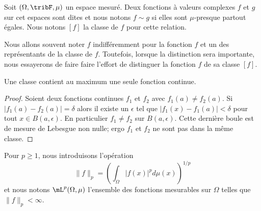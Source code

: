 \begin{definition}      \label{DEFooKMJQooXeaUtp}
    Soit \( (\Omega,\tribF,\mu)\) un espace mesuré. Deux fonctions à valeurs complexes \( f\) et \( g\) sur cet espaces sont dites  et nous notons \( f\sim g\) si elles sont \( \mu\)-presque partout égales. Nous notons \( [f]\) la classe de \( f\) pour cette relation.
\end{definition}

Nous allons souvent noter \( f\) indifféremment pour la fonction \( f\) et un des représentants de la classe de \( f\). Toutefois, lorsque la distinction sera importante, nous essayerons de faire faire l'effort de distinguer la fonction \( f\) de sa classe \( [f]\).

\begin{lemma}
    Une classe contient au maximum une seule fonction continue.
\end{lemma}

\begin{proof}
    Soient deux fonctions continues \( f_1\) et \( f_2\) avec \( f_1(a)\neq f_2(a)\). Si \( | f_1(a)-f_2(a) |=\delta\) alors il existe un \( \epsilon\) tel que \( | f_1(x)-f_1(a) |<\delta\) pour tout \( x\in B(a,\epsilon)\). En particulier \( f_1\neq f_2\) sur \( B(a,\epsilon)\). Cette dernière boule est de mesure de Lebesgue non nulle; ergo \( f_1\) et \( f_2\) ne sont pas dans la même classe.
\end{proof}

\begin{definition}      \label{DEFooTHIDooWYzBtn}
    Pour \( p\geq 1\), nous introduisons l'opération
    \begin{equation}        \label{EQooBDBXooCHRmpo}
        \| f \|_p=\left( \int_{\Omega}| f(x) |^pd\mu(x) \right)^{1/p}
    \end{equation}
    et nous notons \( \mL^p(\Omega,\mu)\) l'ensemble des fonctions mesurables sur \( \Omega\) telles que \( \| f \|_p<\infty\).
\end{definition}

